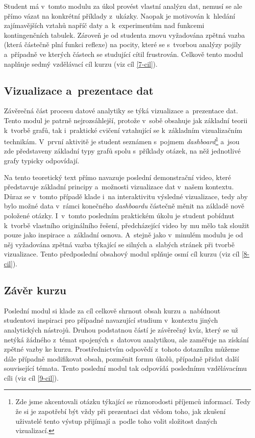 Student má v~tomto modulu za úkol provést vlastní analýzu dat, nemusí se ale přímo vázat na konkrétní příklady z~ukázky. Naopak je motivován k~hledání zajímavějších vztahů napříč daty a~k~experimentům nad funkcemi kontingenčních tabulek. Zároveň je od studenta znovu vyžadována zpětná vazba (která částečně plní funkci reflexe) na pocity, které se s~tvorbou analýzy pojily a~případně ve kterých částech se studující cítil frustrován. Celkově tento modul naplňuje sedmý vzdělávací cíl kurzu (viz cíl \ref{7-cil}).

\hypertarget{vizualizace-a-prezentace-dat}{%
\subsection{Vizualizace a~prezentace dat}\label{vizualizace-a-prezentace-dat}}

Závěrečná část procesu datové analytiky se týká vizualizace a~prezentace dat. Tento modul je patrně nejrozsáhlejší, protože v~sobě obsahuje jak základní teorii k~tvorbě grafů, tak i~praktické cvičení vztahující se k~základním vizualizačním technikám. V~první aktivitě je student seznámen s~pojmem \emph{dashboard}\footnote{Zde jsme akcentovali otázku týkající se různorodosti příjemců informací. Tedy že si je zapotřebí být vždy při prezentaci dat vědom toho, jak zkušení uživatelé tento výstup přijímají a~podle toho volit složitost daných vizualizací.} a~jsou zde představeny základní typy grafů spolu s~příklady otázek, na něž jednotlivé grafy typicky odpovídají.

Na tento teoretický text přímo navazuje poslední demonstrační video, které představuje základní principy a~možnosti vizualizace dat v~našem kontextu. Důraz se v~tomto případě klade i~na interaktivitu výsledné vizualizace, tedy aby bylo možné data v~rámci konečného \emph{dashboardu} částečně měnit na základě nově položené otázky. I~v~tomto posledním praktickém úkolu je student pobídnut k~tvorbě vlastního originálního řešení, předcházející video by mu mělo tak sloužit pouze jako inspirace a~základní osnova. A~stejně jako v~minulém modulu je od něj vyžadována zpětná vazba týkající se silných a~slabých stránek při tvorbě vizualizace. Tento předposlední obsahový modul splňuje osmí cíl kurzu (viz cíl \ref{8-cil}).

\hypertarget{zuxe1vux11br-kurzu}{%
\subsection{Závěr kurzu}\label{zuxe1vux11br-kurzu}}

Poslední modul si klade za cíl celkově shrnout obsah kurzu a~nabídnout studentovi inspiraci pro případné navazující studium v~kontextu jiných analytických nástrojů. Druhou podstatnou částí je závěrečný kvíz, který se už netýká žádného z~témat spojených s~datovou analytikou, ale zaměřuje na získání zpětné vazby ke kurzu. Prostřednictvím odpovědí z~tohoto dotazníku můžeme dále případně modifikovat obsah, pozměnit formu úkolů, případně přidat další související témata. Tento poslední modul tak odpovídá poslednímu vzdělávacímu cíli (viz cíl \ref{9-cil}).
